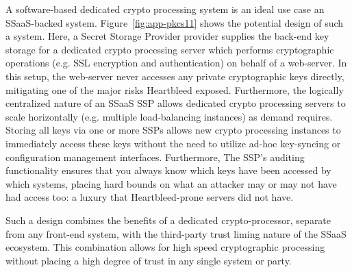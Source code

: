 A software-based dedicated crypto processing system is an ideal use
case an SSaaS-backed system. Figure~\ref{fig:app-pkcs11} shows the
potential design of such a system. Here, a Secret Storage Provider
provider supplies the back-end key storage for a dedicated crypto
processing server which performs cryptographic operations (e.g. SSL
encryption and authentication) on behalf of a web-server. In this
setup, the web-server never accesses any private cryptographic keys
directly, mitigating one of the major risks Heartbleed
exposed. Furthermore, the logically centralized nature of an SSaaS SSP
allows dedicated crypto processing servers to scale horizontally
(e.g. multiple load-balancing instances) as demand requires. Storing
all keys via one or more SSPs allows new crypto processing instances
to immediately access these keys without the need to utilize ad-hoc
key-syncing or configuration management interfaces. Furthermore, The
SSP's auditing functionality ensures that you always know which keys
have been accessed by which systems, placing hard bounds on what an
attacker may or may not have had access too: a luxury that
Heartbleed-prone servers did not have.

Such a design combines the benefits of a dedicated crypto-processor,
separate from any front-end system, with the third-party trust liming
nature of the SSaaS ecosystem. This combination allows for high speed
cryptographic processing without placing a high degree of trust in any
single system or party.

